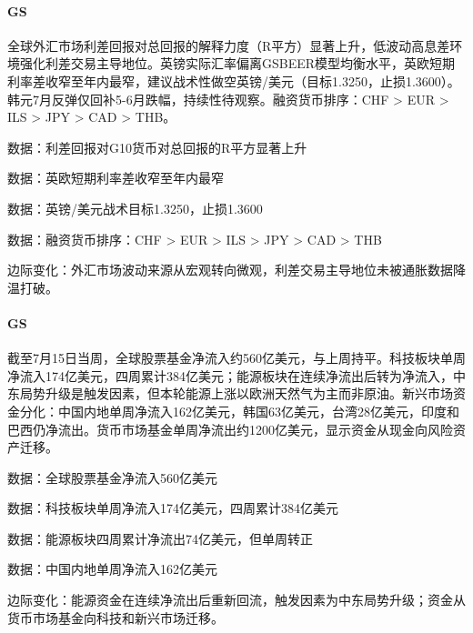 \documentclass[11pt]{ctexart}
\begin{document}
\paragraph{GS} 全球外汇市场利差回报对总回报的解释力度（R平方）显著上升，低波动高息差环境强化利差交易主导地位。英镑实际汇率偏离GSBEER模型均衡水平，英欧短期利率差收窄至年内最窄，建议战术性做空英镑/美元（目标1.3250，止损1.3600）。韩元7月反弹仅回补5-6月跌幅，持续性待观察。融资货币排序：CHF > EUR > ILS > JPY > CAD > THB。
{\small\color{refgray}数据：利差回报对G10货币对总回报的R平方显著上升\par}
{\small\color{refgray}数据：英欧短期利率差收窄至年内最窄\par}
{\small\color{refgray}数据：英镑/美元战术目标1.3250，止损1.3600\par}
{\small\color{refgray}数据：融资货币排序：CHF > EUR > ILS > JPY > CAD > THB\par}
{\small\color{refgray}边际变化：外汇市场波动来源从宏观转向微观，利差交易主导地位未被通胀数据降温打破。\par}
\paragraph{GS} 截至7月15日当周，全球股票基金净流入约560亿美元，与上周持平。科技板块单周净流入174亿美元，四周累计384亿美元；能源板块在连续净流出后转为净流入，中东局势升级是触发因素，但本轮能源上涨以欧洲天然气为主而非原油。新兴市场资金分化：中国内地单周净流入162亿美元，韩国63亿美元，台湾28亿美元，印度和巴西仍净流出。货币市场基金单周净流出约1200亿美元，显示资金从现金向风险资产迁移。
{\small\color{refgray}数据：全球股票基金净流入560亿美元\par}
{\small\color{refgray}数据：科技板块单周净流入174亿美元，四周累计384亿美元\par}
{\small\color{refgray}数据：能源板块四周累计净流出74亿美元，但单周转正\par}
{\small\color{refgray}数据：中国内地单周净流入162亿美元\par}
{\small\color{refgray}边际变化：能源资金在连续净流出后重新回流，触发因素为中东局势升级；资金从货币市场基金向科技和新兴市场迁移。\par}
\end{document}
